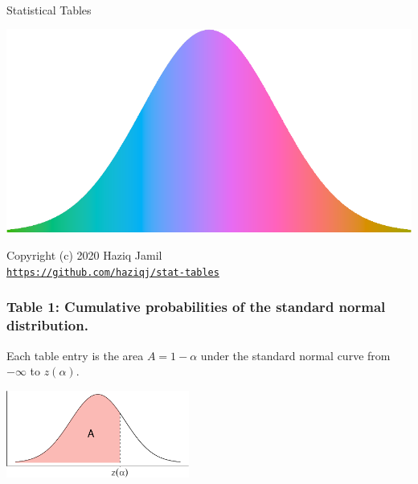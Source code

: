 \documentclass[]{article}
\author{}
\date{\vspace{-2.5em}}
\begin{document}
\thispagestyle{empty}
\begin{center}
~\\
\vspace{2cm}
{\Huge Statistical Tables}
\vspace{5cm}
\end{center}

\begin{center}\includegraphics[width=\textwidth]{stat-tables_files/figure-latex/unnamed-chunk-1-1} \end{center}

\vfill
\begin{center}
Copyright (c) 2020 Haziq Jamil
~\\
\href{https://github.com/haziqj/stat-tables}{\texttt{https://github.com/haziqj/stat-tables}}
\end{center}

\newpage

\hypertarget{table-1-cumulative-probabilities-of-the-standard-normal-distribution.}{%
\subsubsection{Table 1: Cumulative probabilities of the standard normal
distribution.}\label{table-1-cumulative-probabilities-of-the-standard-normal-distribution.}}

Each table entry is the area \(A=1-\alpha\) under the standard normal
curve from \(-\infty\) to \(z(\alpha)\).

\vspace{1em}

\begin{center}\includegraphics[width=6cm]{stat-tables_files/figure-latex/unnamed-chunk-2-1} \end{center}
\end{document}
